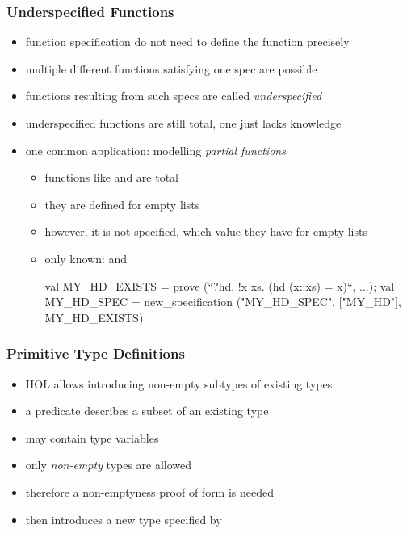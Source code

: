 \begin{frame}[fragile]
\frametitle{Underspecified Functions}
\begin{itemize}
\item function specification do not need to define the function precisely
\item multiple different functions satisfying one spec are possible
\item functions resulting from such specs are called \emph{underspecified}
\item underspecified functions are still total, one just lacks knowledge
\item one common application: modelling \emph{partial functions}
\begin{itemize}
\item functions like \eg {} and  are total
\item they are defined for empty lists
\item however, it is not specified, which value they have for empty lists
\item only known:  and 
\begin{minipage}{.7\textwidth}\medskip
\begin{semiverbatim}\scriptsize
val MY_HD_EXISTS = prove (``?hd. !x xs. (hd (x::xs) = x)``, ...);
val MY_HD_SPEC = 
  new_specification ("MY_HD_SPEC", ["MY_HD"], MY_HD_EXISTS) 
\end{semiverbatim}
\end{minipage}
\end{itemize}
\end{itemize}
\end{frame}



\begin{frame}
\frametitle{Primitive Type Definitions}
\begin{itemize}
\item HOL allows introducing non-empty subtypes of existing types
\item a predicate  describes a subset of an existing type 
\item {} may contain type variables
\item only \emph{non-empty} types are allowed
\item therefore a non-emptyness proof  of form  is needed
\item {} then introduces a new type 
  specified by 
\end{itemize}
\end{frame}

